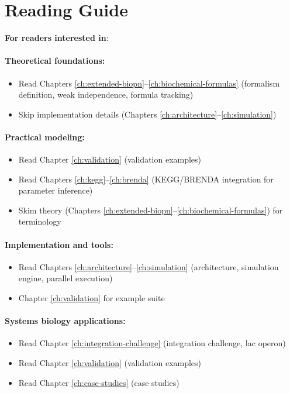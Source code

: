 \section{Reading Guide}
\label{sec:reading-guide}

\textbf{For readers interested in}:

\paragraph{Theoretical foundations:}
\begin{itemize}
    \item Read Chapters \ref{ch:extended-biopn}--\ref{ch:biochemical-formulas} (formalism definition, weak independence, formula tracking)
    \item Skip implementation details (Chapters \ref{ch:architecture}--\ref{ch:simulation})
\end{itemize}

\paragraph{Practical modeling:}
\begin{itemize}
    \item Read Chapter \ref{ch:validation} (validation examples)
    \item Read Chapters \ref{ch:kegg}--\ref{ch:brenda} (KEGG/BRENDA integration for parameter inference)
    \item Skim theory (Chapters \ref{ch:extended-biopn}--\ref{ch:biochemical-formulas}) for terminology
\end{itemize}

\paragraph{Implementation and tools:}
\begin{itemize}
    \item Read Chapters \ref{ch:architecture}--\ref{ch:simulation} (architecture, simulation engine, parallel execution)
    \item Chapter \ref{ch:validation} for example suite
\end{itemize}

\paragraph{Systems biology applications:}
\begin{itemize}
    \item Read Chapter \ref{ch:integration-challenge} (integration challenge, lac operon)
    \item Read Chapter \ref{ch:validation} (validation examples)
    \item Read Chapter \ref{ch:case-studies} (case studies)
\end{itemize}

